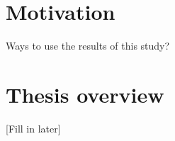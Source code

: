 
\section{Motivation}
Ways to use the results of this study? 

\section{Thesis overview}
[Fill in later]

